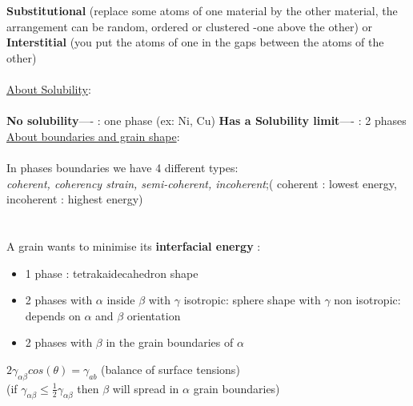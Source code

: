 \documentclass{summary_notes}
\begin{document}
\textbf{Substitutional} (replace some atoms of one material by the other material, the arrangement can be random, ordered or clustered -one above the other) or \\
\textbf{Interstitial} (you put the atoms of one in the gaps between the atoms of the other)\\
\\
\underline{About Solubility}:\\
\\
\textbf{No solubility}---- : one phase (ex: Ni, Cu)
\textbf{Has a Solubility limit}---- : 2 phases 
\\

% 
% 
 
 \underline{About boundaries and grain shape}:\\
\\
In phases boundaries we have 4 different types:  \\
\textit{coherent, coherency strain, semi-coherent, incoherent};(
coherent : lowest energy, incoherent : highest energy)\\
\\
\vspace{0.75cm}
\\
A grain wants to minimise its \textbf{interfacial energy} :
\begin{itemize}
\item 1 phase : tetrakaidecahedron shape
\item 2 phases with $\alpha$ inside $\beta$
\subitem with $\gamma$ isotropic: sphere shape
\subitem with $\gamma$ non isotropic: depends on $\alpha$ and $\beta$ orientation
\item 2 phases with $\beta$ in the grain boundaries of $\alpha$
\end{itemize}

     \centering   $2\gamma_{\alpha \beta}cos(\theta) = \gamma_{ab}$ (balance of surface tensions) \\
     
(if $\gamma_{\alpha \beta} \leq \frac{1}{2}\gamma_{\alpha \beta}$ then $\beta$ will spread in $\alpha$ grain boundaries)
\end{document}
